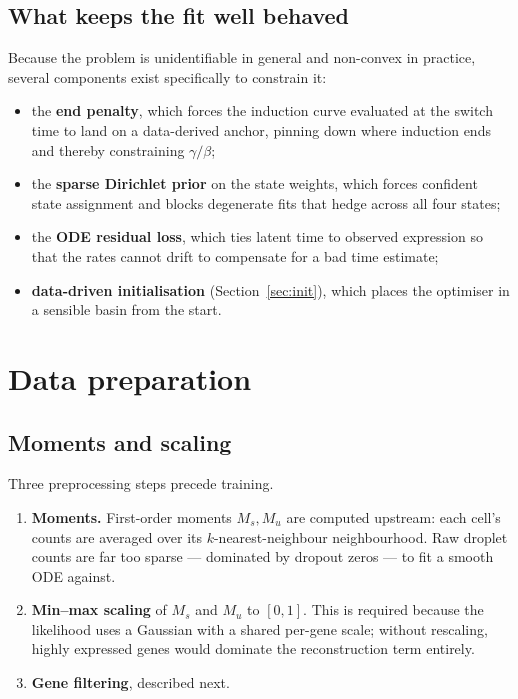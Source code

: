 \documentclass[11pt,a4paper]{article}
\theoremstyle{definition}
\begin{document}
\subsection{What keeps the fit well behaved}

Because the problem is unidentifiable in general and non-convex in practice,
several components exist specifically to constrain it:

\begin{itemize}[leftmargin=*]
\item the \textbf{end penalty}, which forces the induction curve evaluated at
      the switch time to land on a data-derived anchor, pinning down where
      induction ends and thereby constraining $\gamma/\beta$;
\item the \textbf{sparse Dirichlet prior} on the state weights, which forces
      confident state assignment and blocks degenerate fits that hedge across
      all four states;
\item the \textbf{ODE residual loss}, which ties latent time to observed
      expression so that the rates cannot drift to compensate for a bad time
      estimate;
\item \textbf{data-driven initialisation} (Section~\ref{sec:init}), which
      places the optimiser in a sensible basin from the start.
\end{itemize}

\section{Data preparation}
\label{sec:data}

\subsection{Moments and scaling}

Three preprocessing steps precede training.

\begin{enumerate}[leftmargin=*]
\item \textbf{Moments.} First-order moments $M_s, M_u$ are computed upstream:
      each cell's counts are averaged over its $k$-nearest-neighbour
      neighbourhood. Raw droplet counts are far too sparse --- dominated by
      dropout zeros --- to fit a smooth ODE against.
\item \textbf{Min--max scaling} of $M_s$ and $M_u$ to $[0,1]$. This is
      required because the likelihood uses a Gaussian with a shared per-gene
      scale; without rescaling, highly expressed genes would dominate the
      reconstruction term entirely.
\item \textbf{Gene filtering}, described next.
\end{enumerate}
\end{document}
